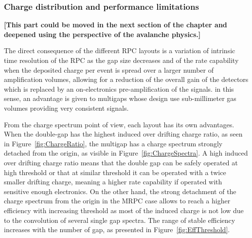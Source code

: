 		\subsubsection{Charge distribution and performance limitations}
		\label{chapt4:sssec:charge}
		
	{\color{blue}\textbf{[This part could be moved in the next section of the chapter and deepened using the perspective of the avalanche physics.]}}
		
	The direct consequence of the different RPC layouts is a variation of intrinsic time resolution of the RPC as the gap size decreases and of the rate capability when the deposited charge per event is spread over a larger number of amplification volumes, allowing for a reduction of the overall gain of the detectors which is replaced by an on-electronics pre-amplification of the signals. in this sense, an advantage is given to multigaps whose design use sub-millimeter gas volumes providing very consistent signals.
	
	From the charge spectrum point of view, each layout has its own advantages. When the double-gap has the highest induced over drifting charge ratio, as seen in Figure~\ref{fig:ChargeRatio}, the multigap has a charge spectrum strongly detached from the origin, as visible in Figure~\ref{fig:ChargeSpectra}. A high induced over drifting charge ratio means that the double gap can be safely operated at high threshold or that at similar threshold it can be operated with a twice smaller drifting charge, meaning a higher rate capability if operated with sensitive enough electronics. On the other hand, the strong detachment of the charge spectrum from the origin in the MRPC case allows to reach a higher efficiency with increasing threshold as most of the induced charge is not low due to the convolution of several single gap spectra. The range of stable efficiency increases with the number of gap, as presented in Figure~\ref{fig:EffThreshold}.
	

